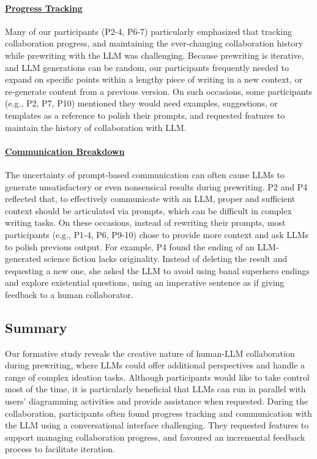 \paragraph{\underline{Progress Tracking}}
Many of our participants (P2-4, P6-7) particularly emphasized that tracking collaboration progress, and maintaining the ever-changing collaboration history while prewriting with the LLM was challenging. Because prewriting is iterative, and LLM generations can be random, our participants frequently needed to expand on specific points within a lengthy piece of writing in a new context, or re-generate content from a previous version. On such occasions, some participants (e.g., P2, P7, P10) mentioned they would need examples, suggestions, or templates as a reference to polish their prompts, and requested features to maintain the history of collaboration with LLM. 
\paragraph{\underline{Communication Breakdown}}
The uncertainty of prompt-based communication can often cause LLMs to generate unsatisfactory or even nonsensical results during prewriting. P2 and P4 reflected that, to effectively communicate with an LLM, proper and sufficient context should be articulated via prompts, which can be difficult in complex writing tasks. On these occasions, instead of rewriting their prompts, most participants (e.g., P1-4, P6, P9-10) chose to provide more context and ask LLMs to polish previous output. For example, P4 found the ending of an LLM-generated science fiction lacks originality. Instead of deleting the result and requesting a new one, she asked the LLM to avoid using banal superhero endings and explore existential questions, using an imperative sentence as if giving feedback to a human collaborator.

\subsection{Summary}
Our formative study reveals the creative nature of human-LLM collaboration during prewriting, where LLMs could offer additional perspectives and handle a range of complex ideation tasks. Although participants would like to take control most of the time, it is particularly beneficial that LLMs can run in parallel with users' diagramming activities and provide assistance when requested. During the collaboration, participants often found progress tracking and communication with the LLM using a conversational interface challenging. They requested features to support managing collaboration progress, and favoured an incremental feedback process to facilitate iteration.

